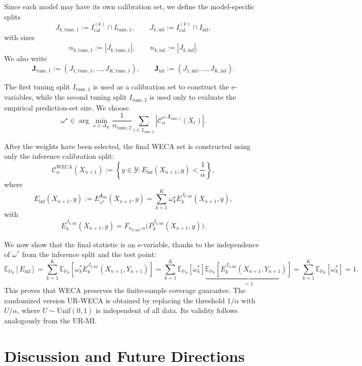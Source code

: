 \documentclass{article}
\theoremstyle{plain}
\theoremstyle{definition}
\theoremstyle{remark}
\begin{document}
Since each model may have its own calibration set, we define the model-specific splits
\[
J_{k,\mathrm{tune},1}
:=
I_{\mathrm{cal}}^{(k)}\cap I_{\mathrm{tune},1},
\qquad
J_{k,\mathrm{inf}}
:=
I_{\mathrm{cal}}^{(k)}\cap I_{\mathrm{inf}},
\]
with sizes
\[
n_{k,\mathrm{tune},1}
:=
|J_{k,\mathrm{tune},1}|,
\qquad
n_{k,\mathrm{inf}}
:=
|J_{k,\mathrm{inf}}|.
\]
We also write
\[
\mathbf J_{\mathrm{tune},1}
:=
(J_{1,\mathrm{tune},1},\ldots,J_{K,\mathrm{tune},1}),
\qquad
\mathbf J_{\mathrm{inf}}
:=
(J_{1,\mathrm{inf}},\ldots,J_{K,\mathrm{inf}}).
\]

The first tuning split $I_{\mathrm{tune},1}$ is used as a calibration set to construct the e-variables, while the second tuning split $I_{\mathrm{tune},2}$ is used only to evaluate the empirical prediction-set size. We choose
\[
\omega^\star
\in
\arg\min_{\omega\in\Delta_K}
\frac1{n_{\mathrm{tune},2}}
\sum_{i\in I_{\mathrm{tune},2}}
\left|
\mathcal C_{\alpha}^{\omega,\mathbf J_{\mathrm{tune},1}}(X_i)
\right|.
\]


After the weights have been selected, the final WECA set is constructed using only the inference calibration split:
\[
\mathcal C_{\alpha}^{\mathrm{WECA}}(X_{n+1})
:=
\left\{
y\in\mathcal Y:
E_{\mathrm{inf}}(X_{n+1},y)<\frac1\alpha
\right\},
\]
where
\[
E_{\mathrm{inf}}(X_{n+1},y)
:=
E_{\omega^\star}^{\mathbf J_{\mathrm{inf}}}(X_{n+1},y)
=
\sum_{k=1}^K
\omega_k^\star
E_k^{J_{k,\mathrm{inf}}}(X_{n+1},y),
\]
with
\[
E_k^{J_{k,\mathrm{inf}}}(X_{n+1},y)
=
F_{n_{k,\mathrm{inf}},\alpha}
\big(
P_k^{J_{k,\mathrm{inf}}}(X_{n+1},y)
\big).
\]

We now show that the final statistic is an e-variable, thanks to the independence of $\omega^*$ from the inference split and the test point:
\[
\mathbb{E}_{\mathbb{H}_0}[E_{\text{inf}}]
=
\sum_{k=1}^K
\mathbb{E}_{\mathbb{H}_0}
\left[
\omega_k^*
E_k^{J_{k,\mathrm{inf}}}(X_{n+1},Y_{n+1})
\right]
=
\sum_{k=1}^K
\mathbb{E}_{\mathbb{H}_0}[\omega_k^*]
\underbrace{
\mathbb{E}_{\mathbb{H}_0}
\left[
E_k^{J_{k,\mathrm{inf}}}(X_{n+1},Y_{n+1})
\right]
}_{=1}
=
\sum_{k=1}^K
\mathbb{E}_{\mathbb{H}_0}[\omega_k^*]
=
1 .
\]
This proves that WECA preserves the finite-sample coverage guarantee. The randomized version UR-WECA is obtained by replacing the threshold $1/\alpha$ with $U/\alpha$, where $U\sim\mathrm{Unif}(0,1)$ is independent of all data. Its validity follows analogously from the UR-MI.




\section{Discussion and Future Directions}
\label{app:future_directions}
\end{document}
